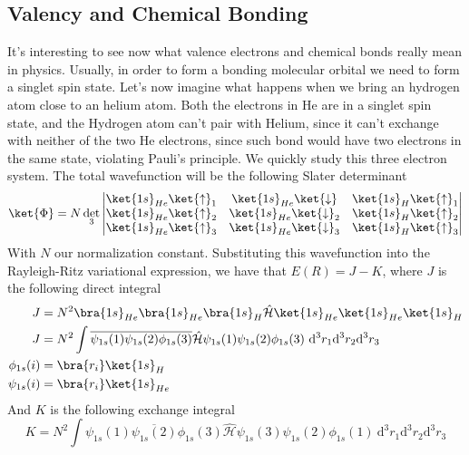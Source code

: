 \documentclass[a4paper, 11pt]{book}
\newcommand{\1}{\opr{\mathds{1}}}
\newcommand{\dddiff}[4][]{\ \mathrm{d}^{#1}#2\mathrm{d}^{#1}#3\mathrm{d}^{#1}#4}
\newcommand{\ham}{\mathcal{H}}
\newcommand{\opr}[1]{\hat{#1}}
\newcommand{\cc}[1]{\overline{#1}}
\theoremstyle{plain}
\begin{document}
	\subsection{Valency and Chemical Bonding}
	It's interesting to see now what valence electrons and chemical bonds really mean in physics. Usually, in order to form a bonding molecular orbital we need to form a singlet spin state. Let's now imagine what happens when we bring an hydrogen atom close to an helium atom. Both the electrons in He are in a singlet spin state, and the Hydrogen atom can't pair with Helium, since it can't exchange with neither of the two He electrons, since such bond would have two electrons in the same state, violating Pauli's principle. We quickly study this three electron system. The total wavefunction will be the following Slater determinant
	\begin{equation}
		\ket{\Phi}=N\det_3\left|\begin{matrix}
			\ket{1s}_{He}\ket{\uparrow}_1&\ket{1s}_{He}\ket{\downarrow}&\ket{1s}_H\ket{\uparrow}_1\\
			\ket{1s}_{He}\ket{\uparrow}_2&\ket{1s}_{He}\ket{\downarrow}_2&\ket{1s}_H\ket{\uparrow}_2\\
			\ket{1s}_{He}\ket{\uparrow}_3&\ket{1s}_{He}\ket{\downarrow}_3&\ket{1s}_H\ket{\uparrow}_3
		\end{matrix}\right|
		\label{eq:HHewavefunction}
	\end{equation}
	With $N$ our normalization constant. Substituting this wavefunction into the Rayleigh-Ritz variational expression, we have that $E(R)=J-K$, where $J$ is the following direct integral
	\begin{equation}
		\begin{aligned}
			J&=N^2\bra{1s}_{He}\bra{1s}_{He}\bra{1s}_H\opr{\ham}\ket{1s}_{He}\ket{1s}_{He}\ket{1s}_H\\
			J&=N^2\int\cc{\psi_{1s}(1)\psi_{1s}(2)\phi_{1s}(3)}\opr{\ham}\psi_{1s}(1)\psi_{1s}(2)\phi_{1s}(3)\dddiff[3]{r_1}{r_2}{r_3}\\
			\phi_{1s}(i)&=\bra{r_i}\ket{1s}_H\\
			\psi_{1s}(i)&=\bra{r_i}\ket{1s}_{He}
		\end{aligned}
		\label{eq:HHedirectintegral}
	\end{equation}
	And $K$ is the following exchange integral
	\begin{equation}
		K=N^2\int\cc{\psi_{1s}(1)\psi_{1s}(2)\phi_{1s}(3)}\opr{\ham}\psi_{1s}(3)\psi_{1s}(2)\phi_{1s}(1)\dddiff[3]{r_1}{r_2}{r_3}
		\label{eq:HHeexchangeintegral}
	\end{equation}
\end{document}
